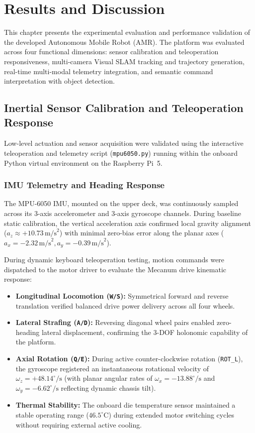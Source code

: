 \chapter{Results and Discussion}
\label{ch:results_and_discussion}

This chapter presents the experimental evaluation and performance validation of the developed Autonomous Mobile Robot (AMR). The platform was evaluated across four functional dimensions: sensor calibration and teleoperation responsiveness, multi-camera Visual SLAM tracking and trajectory generation, real-time multi-modal telemetry integration, and semantic command interpretation with object detection.

\section{Inertial Sensor Calibration and Teleoperation Response}
Low-level actuation and sensor acquisition were validated using the interactive teleoperation and telemetry script (\texttt{mpu6050.py}) running within the onboard Python virtual environment on the Raspberry Pi~5.

\subsection{IMU Telemetry and Heading Response}
The MPU-6050 IMU, mounted on the upper deck, was continuously sampled across its 3-axis accelerometer and 3-axis gyroscope channels. During baseline static calibration, the vertical acceleration axis confirmed local gravity alignment ($a_z \approx +10.73\,\text{m/s}^2$) with minimal zero-bias error along the planar axes ($a_x = -2.32\,\text{m/s}^2, a_y = -0.39\,\text{m/s}^2$). 

During dynamic keyboard teleoperation testing, motion commands were dispatched to the motor driver to evaluate the Mecanum drive kinematic response:
\begin{itemize}
    \item \textbf{Longitudinal Locomotion (\texttt{W/S}):} Symmetrical forward and reverse translation verified balanced drive power delivery across all four wheels.
    \item \textbf{Lateral Strafing (\texttt{A/D}):} Reversing diagonal wheel pairs enabled zero-heading lateral displacement, confirming the 3-DOF holonomic capability of the platform.
    \item \textbf{Axial Rotation (\texttt{Q/E}):} During active counter-clockwise rotation (\texttt{ROT\_L}), the gyroscope registered an instantaneous rotational velocity of $\omega_z = +48.14^\circ/\text{s}$ (with planar angular rates of $\omega_x = -13.88^\circ/\text{s}$ and $\omega_y = -6.62^\circ/\text{s}$ reflecting dynamic chassis tilt).
    \item \textbf{Thermal Stability:} The onboard die temperature sensor maintained a stable operating range ($46.5^\circ\text{C}$) during extended motor switching cycles without requiring external active cooling.
\end{itemize}

